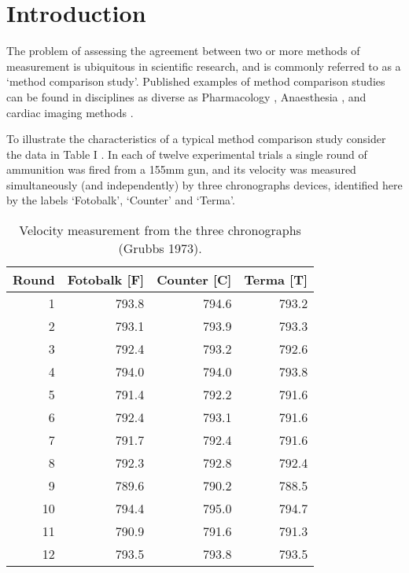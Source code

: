 \documentclass[12pt, a4paper]{report}
\begin{document}
\bigskip


\section{Introduction}
The problem of assessing the agreement between two or more methods
of measurement is ubiquitous in scientific research, and is
commonly referred to as a `method comparison study'. Published
examples of method comparison studies can be found in disciplines
as diverse as Pharmacology \citep{ludbrook97}, Anaesthesia
\citep{Myles}, and cardiac imaging methods \citep{Krumm}.
\smallskip

To illustrate the characteristics of a typical method comparison
study consider the data in Table I \citep{Grubbs73}. In each of
twelve experimental trials a single round of ammunition was fired
from a 155mm gun, and its velocity was measured simultaneously
(and independently) by three chronographs devices, identified here
by the labels `Fotobalk', `Counter' and `Terma'.
\smallskip


\newpage

\begin{table}[ht]
	\begin{center}
		\begin{tabular}{rrrr}
			\hline
			Round& Fotobalk [F] & Counter [C]& Terma [T]\\
			\hline
			1 & 793.8 & 794.6 & 793.2 \\
			2 & 793.1 & 793.9 & 793.3 \\
			3 & 792.4 & 793.2 & 792.6 \\
			4 & 794.0 & 794.0 & 793.8 \\
			5 & 791.4 & 792.2 & 791.6 \\
			6 & 792.4 & 793.1 & 791.6 \\
			7 & 791.7 & 792.4 & 791.6 \\
			8 & 792.3 & 792.8 & 792.4 \\
			9 & 789.6 & 790.2 & 788.5 \\
			10 & 794.4 & 795.0 & 794.7 \\
			11 & 790.9 & 791.6 & 791.3 \\
			12 & 793.5 & 793.8 & 793.5 \\
			\hline
		\end{tabular}
		\caption{Velocity measurement from the three chronographs (Grubbs
			1973).}
	\end{center}
\end{table}
\end{document}
